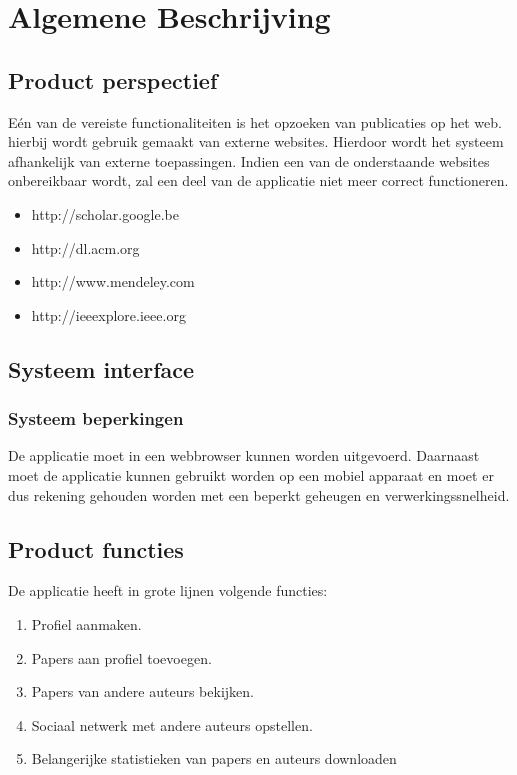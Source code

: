\section{Algemene Beschrijving}

\subsection{Product perspectief}

Eén van de vereiste functionaliteiten is het opzoeken van publicaties op het web. hierbij wordt gebruik gemaakt van externe websites. Hierdoor wordt het systeem afhankelijk van externe toepassingen. Indien een van de onderstaande websites onbereikbaar wordt, zal een deel van de applicatie niet meer correct functioneren.

\begin{itemize}
\item http://scholar.google.be
\item http://dl.acm.org
\item http://www.mendeley.com
\item http://ieeexplore.ieee.org
\end{itemize}


\subsection{Systeem interface}

\subsubsection{Systeem beperkingen}

De applicatie moet in een webbrowser kunnen worden uitgevoerd. Daarnaast moet de applicatie kunnen gebruikt worden op een mobiel apparaat en moet er dus rekening gehouden worden met een beperkt geheugen en verwerkingssnelheid.

\subsection{Product functies}

De applicatie heeft in grote lijnen volgende functies:


\begin{enumerate}
\item Profiel aanmaken.
\item Papers aan profiel toevoegen.
\item Papers van andere auteurs bekijken.
\item Sociaal netwerk met andere auteurs opstellen.
\item Belangerijke statistieken van papers en auteurs downloaden
\end{enumerate}


